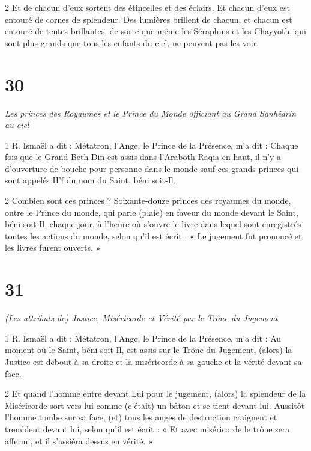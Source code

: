 \par 2 Et de chacun d'eux sortent des étincelles et des éclairs. Et chacun d’eux est entouré de cornes de splendeur. Des lumières brillent de chacun, et chacun est entouré de tentes brillantes, de sorte que même les Séraphins et les Chayyoth, qui sont plus grands que tous les enfants du ciel, ne peuvent pas les voir.

\chapter{30}

\par \textit{Les princes des Royaumes et le Prince du Monde officiant au Grand Sanhédrin au ciel}

\par 1 R. Ismaël a dit : Métatron, l'Ange, le Prince de la Présence, m'a dit : Chaque fois que le Grand Beth Din est assis dans l'Araboth Raqia en haut, il n'y a d'ouverture de bouche pour personne dans le monde sauf ces grands princes qui sont appelés H'f du nom du Saint, béni soit-Il.

\par 2 Combien sont ces princes ? Soixante-douze princes des royaumes du monde, outre le Prince du monde, qui parle (plaie) en faveur du monde devant le Saint, béni soit-Il, chaque jour, à l'heure où s'ouvre le livre dans lequel sont enregistrés toutes les actions du monde, selon qu'il est écrit : « Le jugement fut prononcé et les livres furent ouverts. »

\chapter{31}

\par \textit{(Les attributs de) Justice, Miséricorde et Vérité par le Trône du Jugement}

\par 1 R. Ismaël a dit : Métatron, l'Ange, le Prince de la Présence, m'a dit : Au moment où le Saint, béni soit-Il, est assis sur le Trône du Jugement, (alors) la Justice est debout à sa droite et la miséricorde à sa gauche et la vérité devant sa face.

\par 2 Et quand l'homme entre devant Lui pour le jugement, (alors) la splendeur de la Miséricorde sort vers lui comme (c'était) un bâton et se tient devant lui. Aussitôt l'homme tombe sur sa face, (et) tous les anges de destruction craignent et tremblent devant lui, selon qu'il est écrit : « Et avec miséricorde le trône sera affermi, et il s'assiéra dessus en vérité. »

